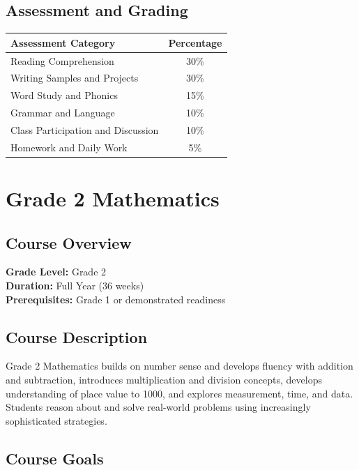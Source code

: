 \documentclass[11pt,letterpaper]{report}
\begin{document}
\section{Assessment and Grading}

\begin{center}
\begin{tabular}{|l|c|}
\hline
\textbf{Assessment Category} & \textbf{Percentage} \\
\hline
Reading Comprehension & 30\% \\
\hline
Writing Samples and Projects & 30\% \\
\hline
Word Study and Phonics & 15\% \\
\hline
Grammar and Language & 10\% \\
\hline
Class Participation and Discussion & 10\% \\
\hline
Homework and Daily Work & 5\% \\
\hline
\end{tabular}
\end{center}

\chapter{Grade 2 Mathematics}

\section{Course Overview}

\textbf{Grade Level:} Grade 2\\
\textbf{Duration:} Full Year (36 weeks)\\
\textbf{Prerequisites:} Grade 1 or demonstrated readiness

\section{Course Description}

Grade 2 Mathematics builds on number sense and develops fluency with addition and subtraction, introduces multiplication and division concepts, develops understanding of place value to 1000, and explores measurement, time, and data. Students reason about and solve real-world problems using increasingly sophisticated strategies.

\section{Course Goals}
\end{document}
